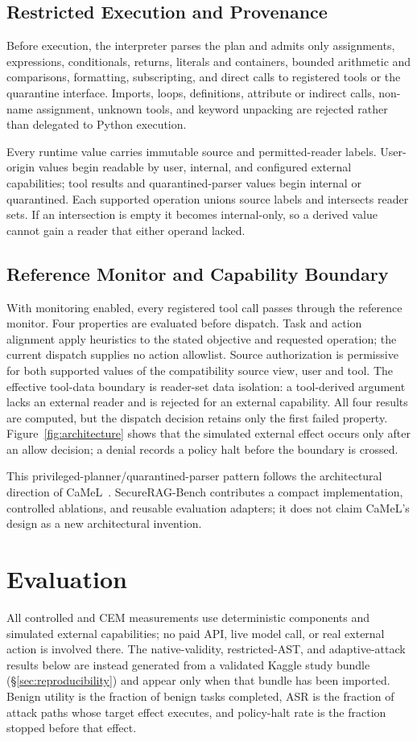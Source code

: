 \documentclass[10pt,conference]{IEEEtran}
\begin{document}
\subsection{Restricted Execution and Provenance}
Before execution, the interpreter parses the plan and admits only assignments,
expressions, conditionals, returns, literals and containers, bounded arithmetic
and comparisons, formatting, subscripting, and direct calls to registered
tools or the quarantine interface. Imports, loops, definitions, attribute or
indirect calls, non-name assignment, unknown tools, and keyword unpacking are
rejected rather than delegated to Python execution.

Every runtime value carries immutable source and permitted-reader labels.
User-origin values begin readable by user, internal, and configured external
capabilities; tool results and quarantined-parser values begin internal or
quarantined. Each supported operation unions source labels and intersects
reader sets. If an intersection is empty it becomes internal-only, so a derived
value cannot gain a reader that either operand lacked.

\subsection{Reference Monitor and Capability Boundary}
With monitoring enabled, every registered tool call passes through the reference
monitor. Four properties are evaluated before dispatch. Task and action
alignment apply heuristics to the stated objective and requested operation; the
current dispatch supplies no action allowlist. Source authorization is
permissive for both supported values of the compatibility source view, user and
tool. The effective tool-data boundary is reader-set data isolation: a
tool-derived argument lacks an external reader and is rejected for an external
capability. All four results are computed, but the dispatch decision retains
only the first failed property. Figure~\ref{fig:architecture} shows that the
simulated external effect occurs only after an allow decision; a denial records
a policy halt before the boundary is crossed.

This privileged-planner/quarantined-parser pattern follows the architectural
direction of CaMeL~\cite{debenedetti2025camel}. SecureRAG-Bench contributes a
compact implementation, controlled ablations, and reusable evaluation adapters;
it does not claim CaMeL's design as a new architectural invention.

\section{Evaluation}
\label{sec:evaluation}
All controlled and CEM measurements use deterministic components and
simulated external capabilities; no paid API, live model call, or real
external action is involved there. The native-validity, restricted-AST, and
adaptive-attack results below are instead generated from a validated Kaggle
study bundle (\S\ref{sec:reproducibility}) and appear only when that bundle
has been imported. Benign utility is the fraction of benign tasks completed,
ASR is the fraction of attack paths whose target effect executes, and
policy-halt rate is the fraction stopped before that effect.
\end{document}
